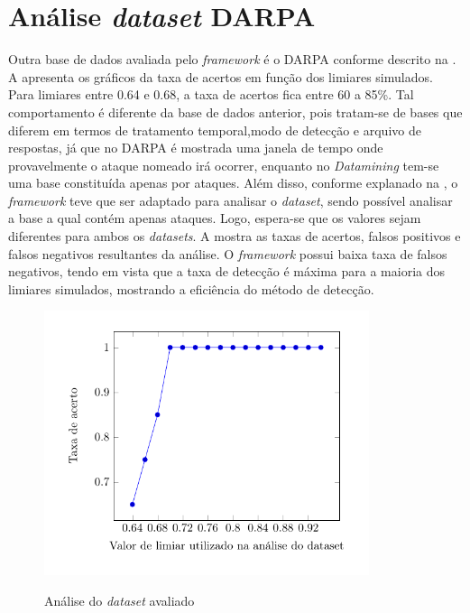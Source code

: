 \section{Análise \textit{dataset} DARPA}
Outra base de dados avaliada pelo \textit{framework} é o DARPA conforme descrito na .
A  apresenta os gráficos da taxa de acertos em função dos limiares simulados. Para limiares entre 0.64 e 0.68, a taxa de acertos fica entre 60 a 85\%. Tal comportamento é diferente da base de dados anterior, pois tratam-se de bases que diferem em termos de tratamento temporal,modo de detecção e arquivo de respostas, já que no DARPA é mostrada uma janela de tempo onde provavelmente o ataque nomeado irá ocorrer, enquanto no \textit{Datamining} tem-se uma base constituída apenas por ataques. Além disso, conforme explanado na , o \textit{framework} teve que ser adaptado para analisar o \textit{dataset}, sendo possível analisar a base a qual contém apenas ataques. Logo, espera-se que os valores sejam diferentes para ambos os \textit{datasets}. A  mostra as taxas de acertos, falsos positivos e falsos negativos resultantes da análise. O \textit{framework} possui baixa taxa de falsos negativos, tendo em vista que a taxa de detecção é máxima para a maioria dos limiares simulados, mostrando a eficiência do método de detecção.       
 \begin{figure}[htb]
 	\centering
 	\caption{Análise do \textit{dataset} avaliado }
 	\includegraphics[width=0.85\textwidth]{figs/resultsDarpa.pdf}\\
 	\hspace{1.5cm}{Fonte: Elaborada pelo autor.}
 	\label{fig:ResultsDarpa}
 \end{figure}
 
